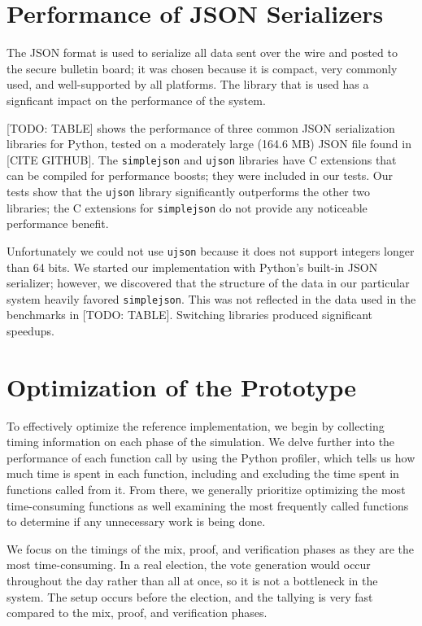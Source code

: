 \section{Performance of JSON Serializers}

The JSON format is used to serialize all data sent over the wire and posted to the secure bulletin board; it was chosen because it is compact, very commonly used, and well-supported by all platforms. The library that is used has a signficant impact on the performance of the system.

[TODO: TABLE] shows the performance of three common JSON serialization libraries for Python, tested on a moderately large (164.6 MB) JSON file found in [CITE GITHUB]. The \texttt{simplejson} and \texttt{ujson} libraries have C extensions that can be compiled for performance boosts; they were included in our tests. Our tests show that the \texttt{ujson} library significantly outperforms the other two libraries; the C extensions for \texttt{simplejson} do not provide any noticeable performance benefit.

Unfortunately we could not use \texttt{ujson} because it does not support integers longer than 64 bits. We started our implementation with Python's built-in JSON serializer; however, we discovered that the structure of the data in our particular system heavily favored \texttt{simplejson}. This was not reflected in the data used in the benchmarks in [TODO: TABLE]. Switching libraries produced significant speedups.

\section{Optimization of the Prototype}

To effectively optimize the reference implementation, we begin by collecting timing information on each phase of the simulation. We delve further into the performance of each function call by using the Python profiler, which tells us how much time is spent in each function, including and excluding the time spent in functions called from it. From there, we generally prioritize optimizing the most time-consuming functions as well examining the most frequently called functions to determine if any unnecessary work is being done.

We focus on the timings of the mix, proof, and verification phases as they are the most time-consuming. In a real election, the vote generation would occur throughout the day rather than all at once, so it is not a bottleneck in the system. The setup occurs before the election, and the tallying is very fast compared to the mix, proof, and verification phases.

